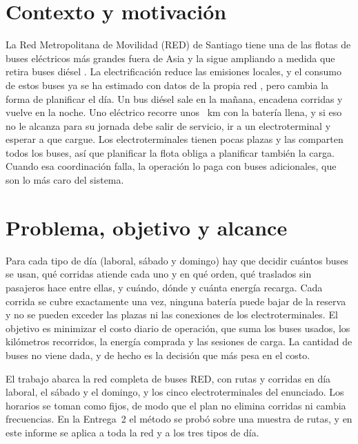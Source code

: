 
\section{Contexto y motivación}
\label{sec:contexto}

La Red Metropolitana de Movilidad (RED) de Santiago tiene una de las flotas de buses eléctricos más grandes fuera de Asia y la sigue ampliando a medida que retira buses diésel \cite{galarza_pilotstoscale_2020,minenergia_electromovilidadred_2026}. La electrificación reduce las emisiones locales, y el consumo de estos buses ya se ha estimado con datos de la propia red \cite{basso_disaggregatedenergy_2024}, pero cambia la forma de planificar el día. Un bus diésel sale en la mañana, encadena corridas y vuelve en la noche. Uno eléctrico recorre unos \AutonomiaNominal~km con la batería llena, y si eso no le alcanza para su jornada debe salir de servicio, ir a un electroterminal y esperar a que cargue. Los electroterminales tienen pocas plazas y las comparten todos los buses, así que planificar la flota obliga a planificar también la carga. Cuando esa coordinación falla, la operación lo paga con buses adicionales, que son lo más caro del sistema.

\section{Problema, objetivo y alcance}
\label{sec:problema-intro}

Para cada tipo de día (laboral, sábado y domingo) hay que decidir cuántos buses se usan, qué corridas atiende cada uno y en qué orden, qué traslados sin pasajeros hace entre ellas, y cuándo, dónde y cuánta energía recarga. Cada corrida se cubre exactamente una vez, ninguna batería puede bajar de la reserva y no se pueden exceder las plazas ni las conexiones de los electroterminales. El objetivo es minimizar el costo diario de operación, que suma los buses usados, los kilómetros recorridos, la energía comprada y las sesiones de carga. La cantidad de buses no viene dada, y de hecho es la decisión que más pesa en el costo.

El trabajo abarca la red completa de buses RED, con \RutasLaboral{} rutas y \CorridasLaboral{} corridas en día laboral, \CorridasSabado{} el sábado y \CorridasDomingo{} el domingo, y los cinco electroterminales del enunciado. Los horarios se toman como fijos, de modo que el plan no elimina corridas ni cambia frecuencias. En la Entrega~2 el método se probó sobre una muestra de \EdosRutasMuestra{} rutas, y en este informe se aplica a toda la red y a los tres tipos de día.

